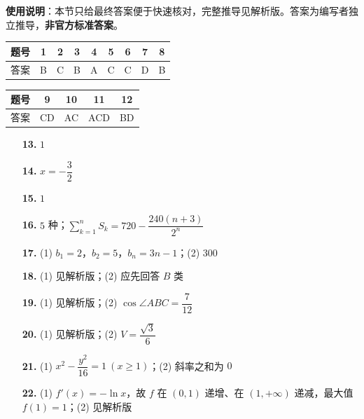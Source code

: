
\begin{gknotice}
\textbf{使用说明}：本节只给最终答案便于快速核对，完整推导见解析版。答案为编写者独立推导，\textbf{非官方标准答案}。
\end{gknotice}

\begin{center}\begin{tabular}{ccccccccc}
\toprule
题号 & 1 & 2 & 3 & 4 & 5 & 6 & 7 & 8 \\
\midrule
答案 & B & C & B & A & C & C & D & B \\
\bottomrule
\end{tabular}\end{center}

\begin{center}\begin{tabular}{ccccc}
\toprule
题号 & 9 & 10 & 11 & 12 \\
\midrule
答案 & CD & AC & ACD & BD \\
\bottomrule
\end{tabular}\end{center}

\begin{itemize}[leftmargin=2.6em]
  \item[\textbf{13.}] $1$
  \item[\textbf{14.}] $x=-\dfrac32$
  \item[\textbf{15.}] $1$
  \item[\textbf{16.}] $5$ 种；$\displaystyle\sum_{k=1}^{n}S_k=720-\dfrac{240(n+3)}{2^{n}}$
\end{itemize}

\begin{itemize}[leftmargin=2.6em]
  \item[\textbf{17.}] (1) $b_1=2$，$b_2=5$，$b_n=3n-1$；(2) $300$
  \item[\textbf{18.}] (1) 见解析版；(2) 应先回答 $B$ 类
  \item[\textbf{19.}] (1) 见解析版；(2) $\cos\angle ABC=\dfrac7{12}$
  \item[\textbf{20.}] (1) 见解析版；(2) $V=\dfrac{\sqrt3}6$
  \item[\textbf{21.}] (1) $x^{2}-\dfrac{y^{2}}{16}=1\ (x\ge1)$；(2) 斜率之和为 $0$
  \item[\textbf{22.}] (1) $f'(x)=-\ln x$，故 $f$ 在 $(0,1)$ 递增、在 $(1,+\infty)$ 递减，最大值 $f(1)=1$；(2) 见解析版
\end{itemize}
